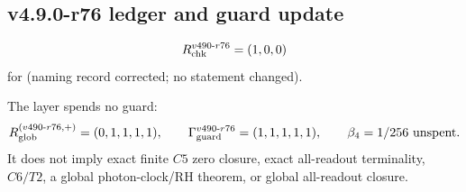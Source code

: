 \subsection*{v4.9.0-r76 ledger and guard update}
\label{subsec:v490-r76-ledger-guard}

\[
R_{\rm chk}^{v490\text{-}r76}=(1,0,0)
\]
for (naming record corrected; no statement changed).

The layer spends no guard:
\[
R_{\rm glob}^{(v490\text{-}r76,+)}=(0,1,1,1,1),
\qquad
\Gamma_{\rm guard}^{v490\text{-}r76}=(1,1,1,1,1),
\qquad
\beta_4=1/256\ \text{unspent}.
\]
It does not imply exact finite \(C5\) zero closure, exact all-readout terminality,
\(C6/T2\), a global photon-clock/RH theorem, or global all-readout closure.
